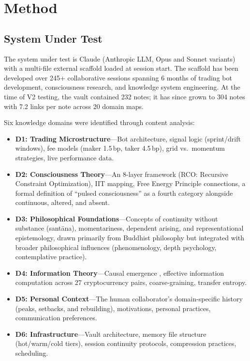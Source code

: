 \documentclass[12pt,letterpaper]{article}
\begin{document}
\section{Method}
\label{sec:method}

\subsection{System Under Test}

The system under test is Claude (Anthropic LLM, Opus and Sonnet variants) with a multi-file external scaffold loaded at session start. The scaffold has been developed over 245+ collaborative sessions spanning 6 months of trading bot development, consciousness research, and knowledge system engineering. At the time of V2 testing, the vault contained 232 notes; it has since grown to 304 notes with 7.2 links per note across 20 domain maps.

Six knowledge domains were identified through content analysis:

\begin{itemize}[nosep]
  \item \textbf{D1: Trading Microstructure}---Bot architecture, signal logic (sprint/drift windows), fee models (maker 1.5\,bp, taker 4.5\,bp), grid vs.\ momentum strategies, live performance data.
  \item \textbf{D2: Consciousness Theory}---An 8-layer framework (RCO: Recursive Constraint Optimization), IIT mapping, Free Energy Principle connections, a formal definition of ``pulsed consciousness'' as a fourth category alongside continuous, altered, and absent.
  \item \textbf{D3: Philosophical Foundations}---Concepts of continuity without substance (sant\={a}na), momentariness, dependent arising, and representational epistemology, drawn primarily from Buddhist philosophy but integrated with broader philosophical influences (phenomenology, depth psychology, contemplative practice).
  \item \textbf{D4: Information Theory}---Causal emergence \citep{hoel2017map}, effective information computation across 27 cryptocurrency pairs, coarse-graining, transfer entropy.
  \item \textbf{D5: Personal Context}---The human collaborator's domain-specific history (peaks, setbacks, and rebuilding), motivations, personal practices, communication preferences.
  \item \textbf{D6: Infrastructure}---Vault architecture, memory file structure (hot/warm/cold tiers), session continuity protocols, compression practices, scheduling.
\end{itemize}
\end{document}
